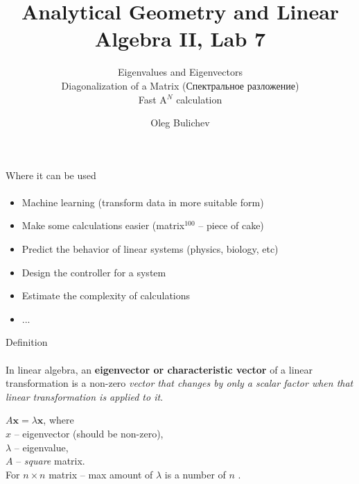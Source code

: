 \documentclass[aspectratio=169]{beamer}
\title[AGLA2]{Analytical Geometry and Linear Algebra II, Lab 7} %
\subtitle{Eigenvalues and Eigenvectors \\ Diagonalization of a Matrix (Спектральное разложение) \\ Fast A$^N$ calculation
         } %
\author{Oleg Bulichev}
\newcommand{\fbckg}[1]{\usebackgroundtemplate{\texttt{[image: \#1]}}}%
\begin{document}
\setlength{\abovedisplayskip}{0pt}
\setlength{\belowdisplayskip}{0pt}
\setlength{\abovedisplayshortskip}{0pt}
\setlength{\belowdisplayshortskip}{0pt}

\fbckg{fibeamer/figs/title_page.png}

\fbckg{fibeamer/figs/common.png}


\begin{frame}[t]{Where it can be used}
\framesubtitle{}
\Large
    \begin{itemize}
        \item Machine learning (transform data in more suitable form)
        \item Make some calculations easier (matrix$^{100}$ – piece of cake)
        \item Predict the behavior of linear systems (physics, biology, etc)
        \item Design the controller for a system
        \item Estimate the complexity of calculations
        \item ...
    \end{itemize}
\end{frame}

\begin{frame}[t]{Definition}
\framesubtitle{}
\Large 
In linear algebra, an \textbf{eigenvector or characteristic vector }of a linear transformation is a non-zero \textit{vector that changes by only a scalar factor when that linear transformation is applied to it}. 
\bigskip

$ A\mathbf{x}=\lambda\mathbf{x}$, where \\ 
$x$ -- eigenvector (should be non-zero), \\ 
$\lambda$ -- eigenvalue, \\ 
$A$ -- \textit{square} matrix. \\ 
For $n \times n$ matrix -- max amount of $\lambda$ is a number of $n$ .
\end{frame}
\end{document}
